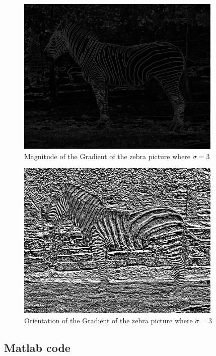 \documentclass[11pt,psfig]{article}
\begin{document}
\begin{figure}[H]
\centering
\includegraphics[height=3in]{magGradient_zebra1.jpg}
\caption{Magnitude of the Gradient of the zebra picture where $\sigma=3$}
\end{figure}

\begin{figure}[H]
\centering
\includegraphics[height=3in]{orientGradient_zebra1.jpg}
\caption{Orientation of the Gradient of the zebra picture where $\sigma=3$}
\end{figure}

\newpage

\subsection*{Matlab code}
\end{document}
